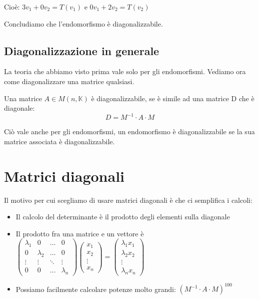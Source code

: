 \documentclass[a4paper, 10pt]{article}
\begin{document}
Cioè: $3v_1 + 0v_2 = T(v_1)$ e $0v_1 + 2v_2 = T(v_2)$

Concludiamo che l'endomorfismo è diagonalizzabile.

\subsection{Diagonalizzazione in generale}

La teoria che abbiamo visto prima vale solo per gli endomorfismi. Vediamo ora come diagonalizzare una matrice qualsiasi.

Una matrice $A \in M(n, \mathbb{K})$ è diagonalizzabile, se è simile ad una matrice D che è diagonale: $$D=M^{-1} \cdot A \cdot M$$

Ciò vale anche per gli endomorfismi, un endomorfismo è diagonalizzabile se la sua matrice associata è diagonalizzabile.

\section{Matrici diagonali}

Il motivo per cui scegliamo di usare matrici diagonali è che ci semplifica i calcoli:

\begin{itemize}
	\item Il calcolo del determinante è il prodotto degli elementi sulla diagonale
	\item Il prodotto fra una matrice e un vettore è $\begin{pmatrix}
		\lambda_1 & 0 & \dots & 0 \\
		0 & \lambda_2 &  \dots & 0 \\
		\vdots & \vdots & \ddots & \vdots \\
		0 & 0 & \dots & \lambda_n
	\end{pmatrix} \begin{pmatrix}
	x_1 \\
	x_2 \\
	\vdots \\
	x_n
	\end{pmatrix} = \begin{pmatrix}
	\lambda_1 x_1 \\
	\lambda_2 x_2 \\
	\vdots \\
	\lambda_n x_n
	\end{pmatrix}$
	\item Possiamo facilmente calcolare potenze molto grandi: $(M^{-1} \cdot A \cdot M)^{100}$
\end{itemize}
\end{document}
